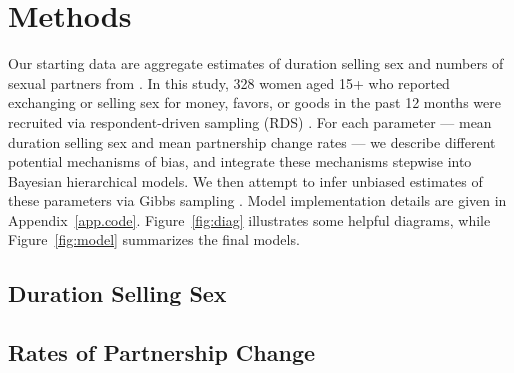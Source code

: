 \section{Methods}\label{meth}
Our starting data are aggregate estimates of
duration selling sex and numbers of sexual partners from \cite{Baral2014}.
In this study, 328 women aged 15+
who reported exchanging or selling sex for money, favors, or goods in the past 12 months
were recruited via respondent-driven sampling (RDS) \cite{Heckathorn1997}.
For each parameter --- mean duration selling sex and mean partnership change rates ---
we describe different potential mechanisms of bias,
and integrate these mechanisms stepwise into Bayesian hierarchical models.
We then attempt to infer unbiased estimates of these parameters
via Gibbs sampling \cite{Geman1984}.
Model implementation details are given in Appendix~\ref{app.code}.
Figure~\ref{fig:diag} illustrates some helpful diagrams, while
Figure~\ref{fig:model} summarizes the final models.

\subsection{Duration Selling Sex}\label{meth.yss}


\subsection{Rates of Partnership Change}\label{meth.parts}

